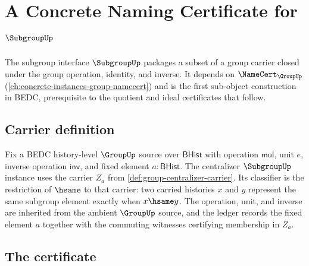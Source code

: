 \chapter{A Concrete Naming Certificate for $\SubgroupUp$}
\label{ch:concrete-instances-subgroup-namecert}

The subgroup interface $\SubgroupUp$ packages a subset of a group carrier closed under the group operation, identity, and inverse. It depends on $\NameCert_{\GroupUp}$ (\autoref{ch:concrete-instances-group-namecert}) and is the first sub-object construction in BEDC, prerequisite to the quotient and ideal certificates that follow.

\section{Carrier definition}
\label{sec:subgroup-carrier}

\begin{definition}
\label{def:subgroup-centralizer-instance}
Fix a BEDC history-level $\GroupUp$ source over $\mathsf{BHist}$ with
operation $\mathsf{mul}$, unit $e$, inverse operation $\mathsf{inv}$, and
fixed element $a:\mathsf{BHist}$. The centralizer $\SubgroupUp$ instance uses
the carrier $Z_a$ from \autoref{def:group-centralizer-carrier}. Its classifier
is the restriction of $\hsame$ to that carrier: two carried histories $x$ and
$y$ represent the same subgroup element exactly when $x\hsame y$. The
operation, unit, and inverse are inherited from the ambient $\GroupUp$ source,
and the ledger records the fixed element $a$ together with the commuting
witnesses certifying membership in $Z_a$.
\end{definition}

\section{The certificate}
\label{sec:subgroup-certificate}

